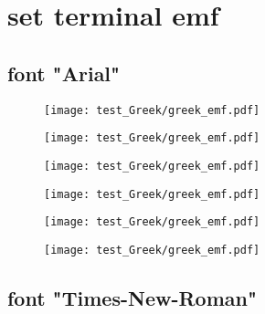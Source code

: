 \documentclass{ltjsarticle}
\begin{document}
		\clearpage%

	\section{set terminal emf}

		\subsection{font "Arial"}

			\begin{figure}[ht]
				\centering
				\begin{minipage}{0.3\columnwidth}
					\texttt{[image: test\_Greek/greek\_emf.pdf]}
				\end{minipage}
				\begin{minipage}{0.3\columnwidth}
					\texttt{[image: test\_Greek/greek\_emf.pdf]}
				\end{minipage}
				\begin{minipage}{0.3\columnwidth}
					\texttt{[image: test\_Greek/greek\_emf.pdf]}
				\end{minipage}
				\begin{minipage}{0.3\columnwidth}
					\texttt{[image: test\_Greek/greek\_emf.pdf]}
				\end{minipage}
				\begin{minipage}{0.3\columnwidth}
					\texttt{[image: test\_Greek/greek\_emf.pdf]}
				\end{minipage}
				\begin{minipage}{0.3\columnwidth}
					\texttt{[image: test\_Greek/greek\_emf.pdf]}
				\end{minipage}
			\end{figure}
			\clearpage%

		\subsection{font "Times-New-Roman"}
\end{document}
